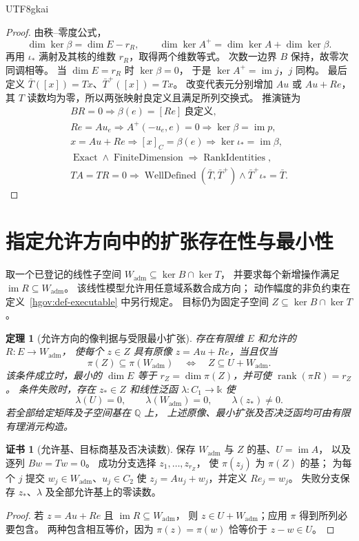 \documentclass[12pt,a4paper,openany,notitlepage]{report}
\theoremstyle{plain}
\newtheorem{theorem}{定理}[chapter]
\theoremstyle{definition}
\newtheorem*{certificate}{证书}
\theoremstyle{remark}
\begin{document}
\begin{CJK*}{UTF8}{gkai}
\begin{proof}
由秩--零度公式，
\[
 \dim\ker\beta=\dim E-r_R,\qquad
 \dim\ker A^+=\dim\ker A+\dim\ker\beta.
\]
再用 $\iota_*$ 满射及其核的维数 $r_R$，取得两个维数等式。
次数一边界 $B$ 保持，故零次同调相等。
当 $\dim E=r_R$ 时 $\ker\beta=0$，
于是 $\ker A^+=\operatorname{im}j$，$j$ 同构。
最后定义 $\bar T([x])=Tx$、$\bar T^+([x])=Tx$。
改变代表元分别增加 $Au$ 或 $Au+Re$，
其 $T$ 读数均为零，所以两张映射良定义且满足所列交换式。
推演链为
\[
 \begin{gathered}
 BR=0\Rightarrow\beta(e)=[Re]\ \text{良定义},\\
 Re=Au_e
 \Rightarrow A^+(-u_e,e)=0
 \Rightarrow\ker\beta=\operatorname{im}p,\\
 x=Au+Re
 \Rightarrow[x]_C=\beta(e)
 \Rightarrow\ker\iota_*=\operatorname{im}\beta,\\
 \operatorname{Exact}\land\operatorname{FiniteDimension}
 \Rightarrow\operatorname{RankIdentities},\\
 TA=TR=0\Rightarrow
 \operatorname{WellDefined}(\bar T,\bar T^+)
 \land\bar T^+\iota_*=\bar T.
 \end{gathered}
\]
\end{proof}

\section{指定允许方向中的扩张存在性与最小性}
\label{exp:hom:restricted-directions}

取一个已登记的线性子空间
$W_{\mathrm{adm}}\subseteq\ker B\cap\ker T$，
并要求每个新增操作满足 $\operatorname{im}R\subseteq W_{\mathrm{adm}}$。
该线性模型允许用任意域系数合成方向；
动作幅度的非负约束在定义~\ref{hgov:def-executable} 中另行规定。
目标仍为固定子空间 $Z\subseteq\ker B\cap\ker T$。

\begin{theorem}[允许方向的像判据与受限最小扩张]
\label{exp:hom:restricted-minimum}
存在有限维 $E$ 和允许的 $R:E\to W_{\mathrm{adm}}$，
使每个 $z\in Z$ 具有原像 $z=Au+Re$，当且仅当
\[
 \pi(Z)\subseteq\pi(W_{\mathrm{adm}})
 \quad\Longleftrightarrow\quad
 Z\subseteq U+W_{\mathrm{adm}}.
\]
该条件成立时，最小的 $\dim E$ 等于
$r_Z=\dim\pi(Z)$，并可使 $\operatorname{rank}(\pi R)=r_Z$。
条件失败时，存在 $z_*\in Z$ 和线性泛函
$\lambda:C_1\to\mathbb k$ 使
\[
 \lambda(U)=0,\qquad
 \lambda(W_{\mathrm{adm}})=0,\qquad
 \lambda(z_*)\ne0.
\]
若全部给定矩阵及子空间基在 $\mathbb Q$ 上，
上述原像、最小扩张及否决泛函均可由有限有理消元构造。
\end{theorem}
\begin{certificate}[允许基、目标商基及否决读数]
保存 $W_{\mathrm{adm}}$ 与 $Z$ 的基、$U=\operatorname{im}A$，
以及逐列 $Bw=Tw=0$。
成功分支选择 $z_1,\ldots,z_{r_Z}$，
使 $\pi(z_j)$ 为 $\pi(Z)$ 的基；
为每个 $j$ 提交 $w_j\in W_{\mathrm{adm}}$、$u_j\in C_2$ 使
$z_j=Au_j+w_j$，并定义 $Re_j=w_j$。
失败分支保存 $z_*$、$\lambda$ 及全部允许基上的零读数。
\end{certificate}
\begin{proof}
若 $z=Au+Re$ 且 $\operatorname{im}R\subseteq W_{\mathrm{adm}}$，
则 $z\in U+W_{\mathrm{adm}}$；应用 $\pi$ 得到所列必要包含。
两种包含相互等价，因为
$\pi(z)=\pi(w)$ 恰等价于 $z-w\in U$。


\end{proof}
\end{CJK*}
\end{document}
